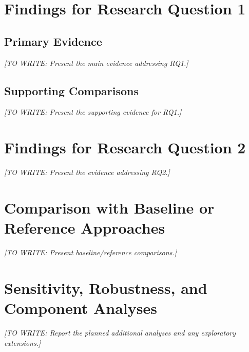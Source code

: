 \documentclass[12pt,a4paper,oneside]{report}
\newif\ifshowguidance
\newcommand{\Guide}[1]{%
  \ifshowguidance
  \begin{tcolorbox}[enhanced,breakable,colback=GuideBlue,
    colframe=GuideBorder,boxrule=0.5pt,arc=1mm,
    title={Writing guide --- replace with your research},
    colbacktitle=ThesisBlue,coltitle=white,fonttitle=\small\bfseries,
    before skip=10pt,after skip=10pt]
    \small #1
  \end{tcolorbox}
  \fi}
\newcommand{\Draft}[1]{\par\noindent\textit{[TO WRITE: #1]}\par}
\begin{document}
\section{Findings for Research Question 1}
\subsection{Primary Evidence}
\Guide{State the question, present the relevant figure/table/theme/proof,
and describe the main finding. Give units, denominators, number of cases
or runs, and uncertainty as applicable. Evidence must support the precision
and scope of the claim.}
\Draft{Present the main evidence addressing RQ1.}
\subsection{Supporting Comparisons}
\Guide{Present the comparisons that help assess the primary finding.
Report magnitude and uncertainty, not only significance labels. For
qualitative analysis, link interpretations to appropriately contextualized
extracts and anonymized identifiers.}
\Draft{Present the supporting evidence for RQ1.}

\section{Findings for Research Question 2}
\Guide{Use a parallel structure where it improves comparison. Add, remove,
or rename question-specific sections to match the actual research questions.}
\Draft{Present the evidence addressing RQ2.}

\section{Comparison with Baseline or Reference Approaches}
\Guide{Use the protocol defined in methods. Report comparable measures,
uncertainty, and relevant costs, such as runtime, data, or resources. If a
comparison is not directly fair, state the difference beside the result.}
\Draft{Present baseline/reference comparisons.}

\section{Sensitivity, Robustness, and Component Analyses}
\Guide{Present effects of changing assumptions, settings, inputs, or model
components. Distinguish stable findings from condition-dependent ones.
Show variability across repeated runs when relevant.}
\Draft{Report the planned additional analyses and any exploratory extensions.}
\end{document}

